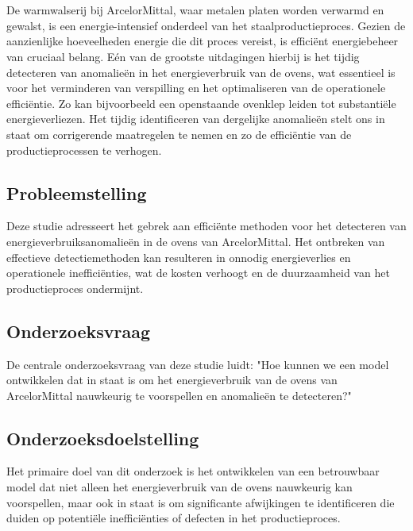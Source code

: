 
\chapter{}%
\label{ch:inleiding}

De warmwalserij bij ArcelorMittal, waar metalen platen worden verwarmd en gewalst, is een energie-intensief onderdeel van het staalproductieproces. Gezien de aanzienlijke hoeveelheden energie die dit proces vereist, is efficiënt energiebeheer van cruciaal belang. Eén van de grootste uitdagingen hierbij is het tijdig detecteren van anomalieën in het energieverbruik van de ovens, wat essentieel is voor het verminderen van verspilling en het optimaliseren van de operationele efficiëntie. Zo kan bijvoorbeeld een openstaande ovenklep leiden tot substantiële energieverliezen. Het tijdig identificeren van dergelijke anomalieën stelt ons in staat om corrigerende maatregelen te nemen en zo de efficiëntie van de productieprocessen te verhogen.

\section{Probleemstelling}
Deze studie adresseert het gebrek aan efficiënte methoden voor het detecteren van energieverbruiksanomalieën in de ovens van ArcelorMittal. Het ontbreken van effectieve detectiemethoden kan resulteren in onnodig energieverlies en operationele inefficiënties, wat de kosten verhoogt en de duurzaamheid van het productieproces ondermijnt.

\section{Onderzoeksvraag}
De centrale onderzoeksvraag van deze studie luidt: "Hoe kunnen we een model ontwikkelen dat in staat is om het energieverbruik van de ovens van ArcelorMittal nauwkeurig te voorspellen en anomalieën te detecteren?"

\section{Onderzoeksdoelstelling}
Het primaire doel van dit onderzoek is het ontwikkelen van een betrouwbaar model dat niet alleen het energieverbruik van de ovens nauwkeurig kan voorspellen, maar ook in staat is om significante afwijkingen te identificeren die duiden op potentiële inefficiënties of defecten in het productieproces.

